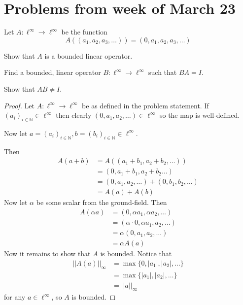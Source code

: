 \section{Problems from week of March 23}
\begin{prob}
    Let $A : \ell^\infty \to \ell^\infty$ be the function 
    \[
        A((a_1,a_2,a_3,\ldots)) = (0,a_1,a_2,a_3,\ldots)
    \]

    Show that $A$ is a bounded linear operator. 

    Find a bounded, linear operator $B : \ell^\infty \to 
    \ell^\infty$ such that $BA = I$. 

    Show that $AB \neq I$.
\end{prob}
\begin{proof}
    Let $A : \ell^\infty \to \ell^\infty$ be as defined in the 
    problem statement. If $(a_i)_{i\in\mathbb N} \in \ell^\infty$ 
    then clearly $(0,a_1,a_2,\ldots)\in \ell^\infty$ so the 
    map is well-defined.

    Now let $a = (a_i)_{i\in\mathbb N}, b = (b_i)_{i\in\mathbb N} 
    \in \ell^\infty$.  
    
    Then 
    \begin{align*}
        A(a+b) &= A((a_1+b_1,a_2+b_2,\ldots)) \\ 
               &= (0,a_1+b_1,a_2+b_2\ldots) \\ 
               &= (0,a_1,a_2,\ldots) + (0,b_1,b_2,\ldots) \\ 
               &= A(a) + A(b)
    \end{align*}
    Now let $\alpha$ be some scalar from the ground-field.  
    Then 
    \begin{align*}
        A(\alpha a) &= (0,\alpha a_1, \alpha a_2,\ldots) \\ 
                    &= (\alpha \cdot 0, \alpha a_1,a_2, \ldots) \\ 
                    &= \alpha (0,a_1,a_2,\ldots) \\ 
                    &= \alpha A(a)
    \end{align*}
    Now it remains to show that $A$ is bounded. Notice 
    that 
    \begin{align*}
        ||A(a)||_\infty &= \max\{0,|a_1|,|a_2|,\ldots\} \\ 
                        &= \max\{|a_1|,|a_2|,\ldots\} \\ 
                        &= ||a||_\infty
    \end{align*}
    for any $a \in \ell^\infty$, so $A$ is bounded.


\end{proof}
